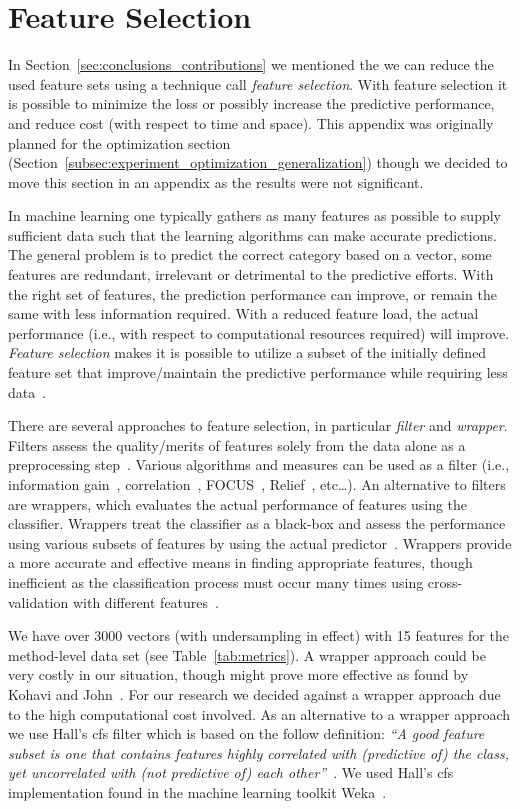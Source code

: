 \chapter{Feature Selection}
\label{app:feature_selection}
In Section~\ref{sec:conclusions_contributions} we mentioned the we can reduce the used feature sets using a technique call \emph{feature selection}. With feature selection it is possible to minimize the loss or possibly increase the predictive performance, and reduce cost (with respect to time and space). This appendix was originally planned for the optimization section (Section~\ref{subsec:experiment_optimization_generalization}) though we decided to move this section in an appendix as the results were not significant.

In machine learning one typically gathers as many features as possible to supply sufficient data such that the learning algorithms can make accurate predictions. The general problem is to predict the correct category based on a vector, some features are redundant, irrelevant or detrimental to the predictive efforts. With the right set of features, the prediction performance can improve, or remain the same with less information required. With a reduced feature load, the actual performance (i.e., with respect to computational resources required) will improve. \emph{Feature selection} makes it is possible to utilize a subset of the initially defined feature set that improve/maintain the predictive performance while requiring less data~\cite{GE03,BL97}.

There are several approaches to feature selection, in particular \emph{filter} and \emph{wrapper}. Filters assess the quality/merits of features solely from the data alone as a preprocessing step~\cite{JKP94,BL97}. Various algorithms and measures can be used as a filter (i.e., information gain~\cite{GE03}, correlation~\cite{Hal99}, FOCUS~\cite{AD91}, Relief~\cite{KR92}, etc\ldots). An alternative to filters are wrappers, which evaluates the actual performance of features using the classifier. Wrappers treat the classifier as a black-box and assess the performance using various subsets of features by using the actual predictor~\cite{JKP94,BL97}. Wrappers provide a more accurate and effective means in finding appropriate features, though inefficient as the classification process must occur many times using cross-validation with different features~\cite{KJ97}.

We have over 3000 vectors (with undersampling in effect) with 15 features for the method-level data set (see Table~\ref{tab:metrics}). A wrapper approach could be very costly in our situation, though might prove more effective as found by Kohavi and John~\cite{KJ97}. For our research we decided against a wrapper approach due to the high computational cost involved. As an alternative to a wrapper approach we use Hall's \gls{cfs} filter which is based on the follow definition: \emph{``A good feature subset is one that contains features highly correlated with (predictive of) the class, yet uncorrelated with (not predictive of) each other''}~\cite{Hal99}. We used Hall's \gls{cfs} implementation found in the machine learning toolkit Weka~\cite{HFH+09}.

